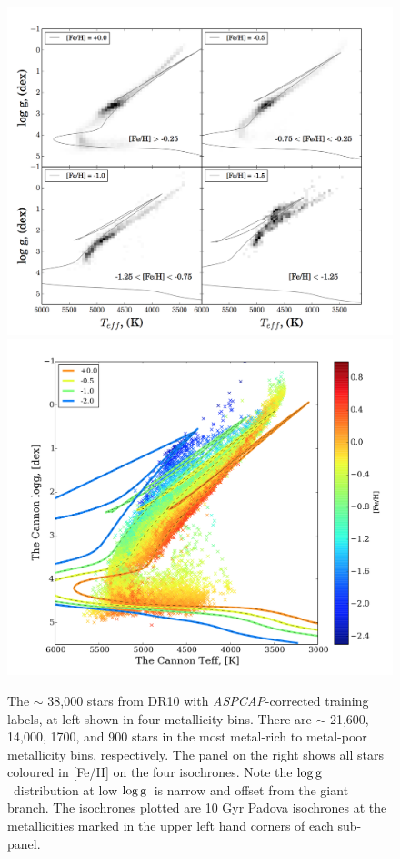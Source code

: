 \documentclass[12pt, preprint]{aastex}
\newcommand{\logg}{\mbox{$\rm \log g$}}
\newcommand{\aspcap}{\textsl{ASPCAP}}
\begin{document}
\begin{figure}[!h]
\centering
  \includegraphics[scale=0.25]{./plots/iso1.png}
  \hspace{-20pt}
    \includegraphics[scale=0.25]{./plots/iso1a.png}
\caption{The $\sim$ 38,000 stars from DR10 with \aspcap-corrected training labels, at left shown in four metallicity bins. There are $\sim$ 21,600, 14,000, 1700, and 900 stars in the most metal-rich to metal-poor metallicity bins, respectively. The panel on the right shows all stars coloured in [Fe/H] on the four isochrones. Note the \logg\ distribution at low \logg\ is narrow and offset from the giant branch. The isochrones plotted are 10 Gyr Padova isochrones at the metallicities marked in the upper left hand corners of each sub-panel.}
\label{fig:iso}
\end{figure}
\end{document}

